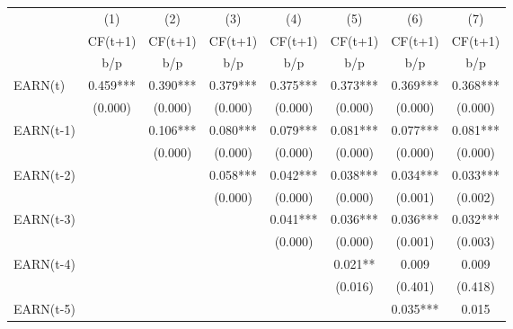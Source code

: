 {
\def\sym#1{\ifmmode^{#1}\else\(^{#1}\)\fi}
\begin{tabular}{l*{7}{c}}
\hline\hline
                    &\multicolumn{1}{c}{(1)}&\multicolumn{1}{c}{(2)}&\multicolumn{1}{c}{(3)}&\multicolumn{1}{c}{(4)}&\multicolumn{1}{c}{(5)}&\multicolumn{1}{c}{(6)}&\multicolumn{1}{c}{(7)}\\
                    &\multicolumn{1}{c}{CF(t+1)}&\multicolumn{1}{c}{CF(t+1)}&\multicolumn{1}{c}{CF(t+1)}&\multicolumn{1}{c}{CF(t+1)}&\multicolumn{1}{c}{CF(t+1)}&\multicolumn{1}{c}{CF(t+1)}&\multicolumn{1}{c}{CF(t+1)}\\
                    &         b/p   &         b/p   &         b/p   &         b/p   &         b/p   &         b/p   &         b/p   \\
\hline
EARN(t)             &       0.459***&       0.390***&       0.379***&       0.375***&       0.373***&       0.369***&       0.368***\\
                    &     (0.000)   &     (0.000)   &     (0.000)   &     (0.000)   &     (0.000)   &     (0.000)   &     (0.000)   \\
EARN(t-1)           &               &       0.106***&       0.080***&       0.079***&       0.081***&       0.077***&       0.081***\\
                    &               &     (0.000)   &     (0.000)   &     (0.000)   &     (0.000)   &     (0.000)   &     (0.000)   \\
EARN(t-2)           &               &               &       0.058***&       0.042***&       0.038***&       0.034***&       0.033***\\
                    &               &               &     (0.000)   &     (0.000)   &     (0.000)   &     (0.001)   &     (0.002)   \\
EARN(t-3)           &               &               &               &       0.041***&       0.036***&       0.036***&       0.032***\\
                    &               &               &               &     (0.000)   &     (0.000)   &     (0.001)   &     (0.003)   \\
EARN(t-4)           &               &               &               &               &       0.021** &       0.009   &       0.009   \\
                    &               &               &               &               &     (0.016)   &     (0.401)   &     (0.418)   \\
EARN(t-5)           &               &               &               &               &               &       0.035***&       0.015   \\

\end{tabular}}
